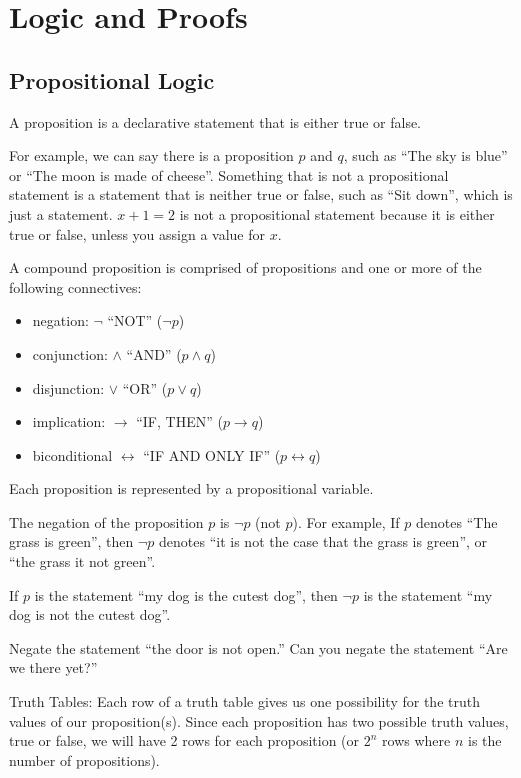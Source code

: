 \documentclass[../discrete.tex]{subfiles}
\begin{document}
\chapter{Logic and Proofs}
\section{Propositional Logic}
A proposition is a declarative statement that is either true or false.

For example, we can say there is a proposition $p$ and $q$, such as ``The sky is blue'' or ``The moon is made of cheese''. Something that is not a propositional statement is a statement that is neither true or false, such as ``Sit down'', which is just a statement. $x+1=2$ is not a propositional statement because it is either true or false, unless you assign a value for $x$.

A compound proposition is comprised of propositions and one or more of the following connectives:
\begin{itemize}
    \item negation: $\neg$ ``NOT'' ($\neg p$)
    \item conjunction: $\land$ ``AND'' ($p\land q$)
    \item disjunction: $\lor$ ``OR'' ($p\lor q$)
    \item implication: $\rightarrow$ ``IF, THEN'' ($p\rightarrow q$)
    \item biconditional $\leftrightarrow$ ``IF AND ONLY IF'' ($p\leftrightarrow q$)
\end{itemize}
Each proposition is represented by a propositional variable.

The negation of the proposition $p$ is $\neg p$ (not $p$). For example, If $p$ denotes ``The grass is green'', then $\neg p$ denotes ``it is not the case that the grass is green'', or ``the grass it not green''.
\begin{example}
    If $p$ is the statement ``my dog is the cutest dog'', then $\neg p$ is the statement ``my dog is not the cutest dog''.
\end{example}
\ex Negate the statement ``the door is not open.''
\ex Can you negate the statement ``Are we there yet?''

Truth Tables: Each row of a truth table gives us one possibility for the truth values of our proposition(s). Since each proposition has two possible truth values, true or false, we will have 2 rows for each proposition (or $2^n$ rows where $n$ is the number of propositions).
\end{document}
